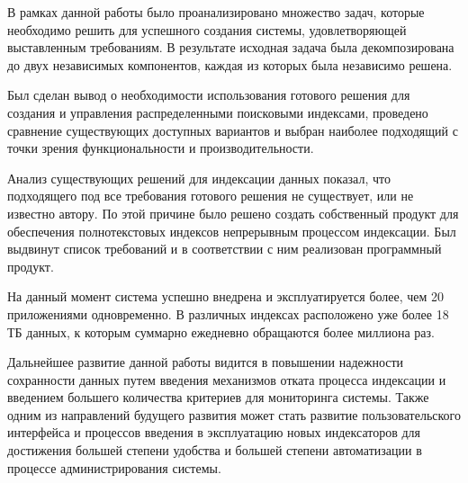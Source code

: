 
В рамках данной работы было проанализировано множество задач, которые необходимо решить для успешного создания системы, удовлетворяющей выставленным требованиям. В результате исходная задача была декомпозирована до двух независимых компонентов, каждая из которых была независимо решена.

Был сделан вывод о необходимости использования готового решения для создания и управления распределенными поисковыми индексами, проведено сравнение существующих доступных вариантов и выбран наиболее подходящий с точки зрения функциональности и производительности.

Анализ существующих решений для индексации данных показал, что подходящего под все требования готового решения не существует, или не известно автору. По этой причине было решено создать собственный продукт для обеспечения полнотекстовых индексов непрерывным процессом индексации. Был выдвинут список требований и в соответствии с ним реализован программный продукт.

На данный момент система успешно внедрена и эксплуатируется более, чем 20 приложениями одновременно. В различных индексах расположено уже более 18 ТБ данных, к которым суммарно ежедневно обращаются более миллиона раз.

Дальнейшее развитие данной работы видится в повышении надежности сохранности данных путем введения механизмов отката процесса индексации и введением большего количества критериев для мониторинга системы. Также одним из направлений будущего развития может стать развитие пользовательского интерфейса и процессов введения в эксплуатацию новых индексаторов для достижения большей степени удобства и большей степени автоматизации в процессе администрирования системы.

\clearpage
